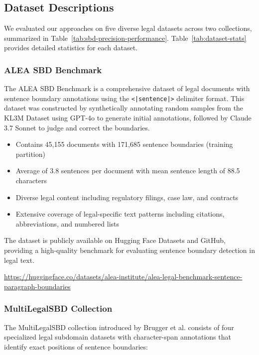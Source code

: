 \pagebreak

\subsection{Dataset Descriptions}
\label{appendix:Datasets}

We evaluated our approaches on five diverse legal datasets across two collections, summarized in Table~\ref{tab:sbd-precision-performance}. Table~\ref{tab:dataset-stats} provides detailed statistics for each dataset.



\subsubsection{ALEA SBD Benchmark}
The ALEA SBD Benchmark is a comprehensive dataset of legal documents with sentence boundary annotations using the \texttt{<|sentence|>} delimiter format. This dataset was constructed by synthetically annotating random samples from the KL3M Dataset using GPT-4o to generate initial annotations, followed by Claude 3.7 Sonnet to judge and correct the boundaries.

\begin{itemize}
    \item Contains 45,155 documents with 171,685 sentence boundaries (training partition)
    \item Average of 3.8 sentences per document with mean sentence length of 88.5 characters 
    \item Diverse legal content including regulatory filings, case law, and contracts
    \item Extensive coverage of legal-specific text patterns including citations, abbreviations, and numbered lists
\end{itemize}

The dataset is publicly available on Hugging Face Datasets and GitHub, providing a high-quality benchmark for evaluating sentence boundary detection in legal text.

\begin{center}
\url{https://huggingface.co/datasets/alea-institute/alea-legal-benchmark-sentence-paragraph-boundaries}
\end{center}

\subsubsection{MultiLegalSBD Collection}
The MultiLegalSBD collection introduced by Brugger et al. \cite{multilegalSBD} consists of four specialized legal subdomain datasets with character-span annotations that identify exact positions of sentence boundaries:

